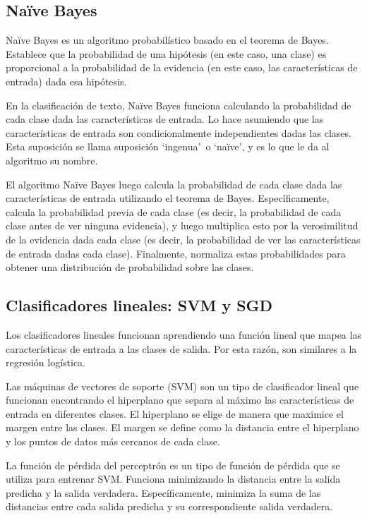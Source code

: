 \subsection{Naïve Bayes}

Naïve Bayes es un algoritmo probabilístico basado en el teorema de Bayes. Establece que la probabilidad de una hipótesis (en este caso, una clase) es proporcional a la probabilidad de la evidencia (en este caso, las características de entrada) dada esa hipótesis.

En la clasificación de texto, Naïve Bayes funciona calculando la probabilidad de cada clase dada las características de entrada. Lo hace asumiendo que las características de entrada son condicionalmente independientes dadas las clases. Esta suposición se llama suposición `ingenua'\ o `naïve', y es lo que le da al algoritmo su nombre.

El algoritmo Naïve Bayes luego calcula la probabilidad de cada clase dada las características de entrada utilizando el teorema de Bayes. Específicamente, calcula la probabilidad previa de cada clase (es decir, la probabilidad de cada clase antes de ver ninguna evidencia), y luego multiplica esto por la verosimilitud de la evidencia dada cada clase (es decir, la probabilidad de ver las características de entrada dadas cada clase). Finalmente, normaliza estas probabilidades para obtener una distribución de probabilidad sobre las clases.

\subsection{Clasificadores lineales: SVM y SGD}

Los clasificadores lineales funcionan aprendiendo una función lineal que mapea las características de entrada a las clases de salida. Por esta razón, son similares a la regresión logística.

Las máquinas de vectores de soporte (SVM) son un tipo de clasificador lineal que funcionan encontrando el hiperplano que separa al máximo las características de entrada en diferentes clases. El hiperplano se elige de manera que maximice el margen entre las clases. El margen se define como la distancia entre el hiperplano y los puntos de datos más cercanos de cada clase.

La función de pérdida del perceptrón es un tipo de función de pérdida que se utiliza para entrenar SVM. Funciona minimizando la distancia entre la salida predicha y la salida verdadera. Específicamente, minimiza la suma de las distancias entre cada salida predicha y su correspondiente salida verdadera.

